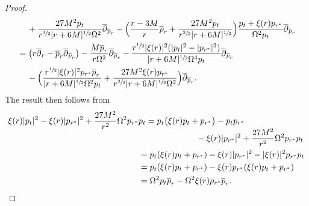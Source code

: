 \documentclass[JEP,XML,SOM,Unicode,published]{cedram}
\theoremstyle{plain}
\theoremstyle{definition}
\begin{document}
\begin{proof}
\begin{align*}
& \quad \, +\frac{27M^2p_t}{r^{\sfrac{3}{2}}|r+6M|^{\sfrac{1}{2}} \Omega^2 } \overline{\partial}_{\overline{p}_r} - \Bigl(\frac{r-3M}{r} \overline{p}_r+ \frac{27M^2 p_t}{r^{\sfrac{3}{2}}|r+6M|^{\sfrac{1}{2}}} \Bigr) \frac{p_t+\xi(r)p_{r^*}}{ \Omega^2p_t}\overline{\partial}_{\overline{p}_r} \\
& =\bigl(r \overline{\partial}_r-\overline{p}_r \overline{\partial}_{\overline{p}_r} \bigr)-\frac{M \overline{p}_r}{r \Omega^2} \overline{\partial}_{\overline{p}_r}-\frac{r^{\sfrac{1}{2}}|\xi(r)|^2(|p_t|^2-|p_{r^*}|^2)}{|r+6M|^{\sfrac{1}{2}}\Omega^4p_t} \overline{\partial}_{\overline{p}_r} \\
& \quad \, - \Bigl(\frac{r^{\sfrac{1}{2}}|\xi (r)|^2p_{r^*} \overline{p}_r}{|r+6M|^{\sfrac{1}{2}}\Omega^2p_t} + \frac{27M^2 \xi(r)p_{r^*} }{r^{\sfrac{3}{2}}|r+6M|^{\sfrac{1}{2}}\Omega^2} \Bigr) \overline{\partial}_{\overline{p}_r}.
\end{align*}
The result then follows from
\begin{align*}
\xi(r)|p_t|^2-\xi (r) |p_{r^*}|^2+\frac{27M^2}{r^2}\Omega^2 p_{r^*}&p_t =p_t \bigl(\xi (r) p_t+p_{r^*} \bigr)-p_tp_{r^*} \\[-5pt]
&\hspace*{2.4cm} -\xi (r) |p_{r^*}|^2+\frac{27M^2}{r^2}\Omega^2 p_{r^*}p_t \\
& =p_t(\xi (r) p_t+p_{r^*})-\xi (r) |p_{r^*}|^2-|\xi(r)|^2 p_{r^*}p_t \\
& =p_t(\xi (r) p_t+p_{r^*})-\xi(r) p_{r^*}(\xi(r)p_t+p_{r^*}) \\
& =\Omega^2 p_t \overline{p}_r-\Omega^2 \xi(r) p_{r^*} \overline{p}_r.\qedhere
\end{align*}
\end{proof}




\end{document}

